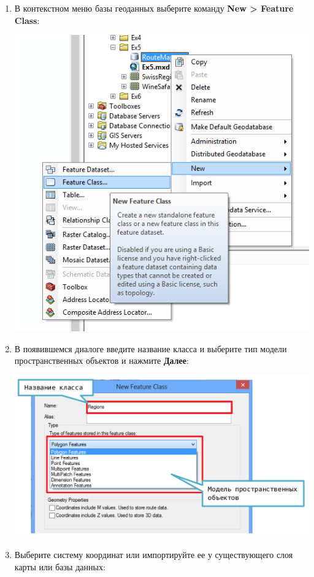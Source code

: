 \documentclass[]{book}
\theoremstyle{definition}
\theoremstyle{definition}
\theoremstyle{definition}
\theoremstyle{remark}
\begin{document}
\begin{enumerate}
\def\labelenumi{\arabic{enumi}.}
\item
  В контекстном меню базы геоданных выберите команду \textbf{New
  \textgreater{} Feature Class}:

  \includegraphics{images/Appendix/image76.png}
\item
  В появившемся диалоге введите название класса и выберите тип модели
  пространственных объектов и нажмите \textbf{Далее}:

  \includegraphics{images/Appendix/image77.png}
\item
  Выберите систему координат или импортируйте ее у существующего слоя
  карты или базы данных:


\end{enumerate}
\end{document}
